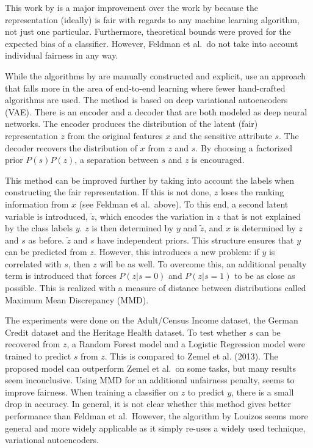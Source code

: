 This work by \citet{feldman2015certifying} is a major improvement over the work by \citet{zemel2013learning}
because the representation (ideally) is fair with regards to any machine learning algorithm, not just one particular.
Furthermore, theoretical bounds were proved for the expected bias of a classifier.
However, Feldman et al.~do not take into account individual fairness in any way.

While the algorithms by \citet{feldman2015certifying} are manually constructed and explicit,
\citet{louizos2015variational} use an approach
that falls more in the area of end-to-end learning where fewer hand-crafted algorithms are used.
The method is based on deep variational autoencoders (VAE).
There is an encoder and a decoder that are both modeled as deep neural networks.
The encoder produces the distribution of the latent (fair) representation \(z\)
from the original features \(x\) and the sensitive attribute \(s\).
The decoder recovers the distribution of \(x\) from \(z\) and \(s\).
By choosing a factorized prior \(P(s)P(z)\), a separation between \(s\) and \(z\) is encouraged.

This method can be improved further by taking into account the labels
when constructing the fair representation.
If this is not done, \(z\) loses the ranking information from \(x\) (see Feldman et al.~above).
To this end, a second latent variable is introduced, \(\tilde{z}\),
which encodes the variation in \(z\) that is not explained by the class labels \(y\).
\(z\) is then determined by \(y\) and \(\tilde{z}\),
and \(x\) is determined by \(z\) and \(s\) as before.
\(\tilde{z}\) and \(s\) have independent priors.
This structure ensures that \(y\) can be predicted from \(z\).
However, this introduces a new problem:
if \(y\) is correlated with \(s\), then \(z\) will be as well.
To overcome this, an additional penalty term is introduced that forces \(P(z|s=0)\)
and \(P(z|s=1)\) to be as close as possible.
This is realized with a measure of distance
between distributions called Maximum Mean Discrepancy (MMD).

The experiments were done on the Adult/Census Income dataset,
the German Credit dataset and the Heritage Health dataset.
To test whether \(s\) can be recovered from \(z\),
a Random Forest model and a Logistic Regression model were trained to predict \(s\) from \(z\).
This is compared to Zemel et al. (2013).
The proposed model can outperform Zemel et al.~on some tasks, but many results seem inconclusive.
Using MMD for an additional unfairness penalty, seems to improve fairness.
When training a classifier on \(z\) to predict \(y\), there is a small drop in accuracy.
In general, it is not clear whether this method gives better performance than Feldman et
al.~However, the algorithm by Louizos seems more general and more widely applicable
as it simply re-uses a widely used technique, variational autoencoders.

